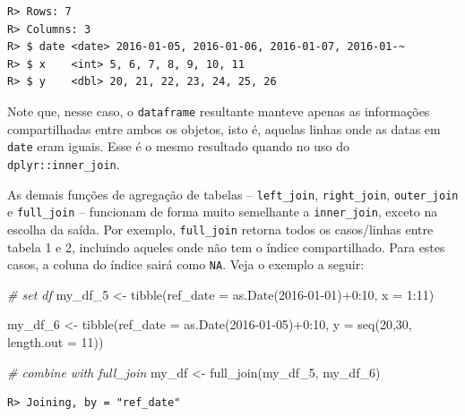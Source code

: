 \documentclass[
  11pt,
]{book}
\newenvironment{Shaded}{\begin{snugshade}}{\end{snugshade}}
\newcommand{\AttributeTok}[1]{\textcolor[rgb]{0.61,0.61,0.61}{#1}}
\newcommand{\CommentTok}[1]{\textcolor[rgb]{0.37,0.37,0.37}{\textit{#1}}}
\newcommand{\DecValTok}[1]{\textcolor[rgb]{0.06,0.06,0.06}{#1}}
\newcommand{\FunctionTok}[1]{\textcolor[rgb]{0,0,0}{#1}}
\newcommand{\NormalTok}[1]{#1}
\newcommand{\OtherTok}[1]{\textcolor[rgb]{0.37,0.37,0.37}{#1}}
\newcommand{\SpecialCharTok}[1]{\textcolor[rgb]{0,0,0}{#1}}
\newcommand{\StringTok}[1]{\textcolor[rgb]{0.5,0.5,0.5}{#1}}
\begin{document}
\begin{verbatim}
R> Rows: 7
R> Columns: 3
R> $ date <date> 2016-01-05, 2016-01-06, 2016-01-07, 2016-01-~
R> $ x    <int> 5, 6, 7, 8, 9, 10, 11
R> $ y    <dbl> 20, 21, 22, 23, 24, 25, 26
\end{verbatim}

Note que, nesse caso, o \texttt{dataframe} resultante manteve apenas as informações compartilhadas entre ambos os objetos, isto é, aquelas linhas onde as datas em \texttt{date} eram iguais. Esse é o mesmo resultado quando no uso do \texttt{dplyr::inner\_join}.

As demais funções de agregação de tabelas -- \texttt{left\_join}, \texttt{right\_join}, \texttt{outer\_join} e \texttt{full\_join} -- funcionam de forma muito semelhante a \texttt{inner\_join}, exceto na escolha da saída. Por exemplo, \texttt{full\_join} retorna todos os casos/linhas entre tabela 1 e 2, incluindo aqueles onde não tem o índice compartilhado. Para estes casos, a coluna do índice sairá como \texttt{NA}. Veja o exemplo a seguir:

\begin{Shaded}
\begin{Highlighting}[]
\CommentTok{\# set df}
\NormalTok{my\_df\_5 }\OtherTok{\textless{}{-}} \FunctionTok{tibble}\NormalTok{(}\AttributeTok{ref\_date =} \FunctionTok{as.Date}\NormalTok{(}\StringTok{\textquotesingle{}2016{-}01{-}01\textquotesingle{}}\NormalTok{)}\SpecialCharTok{+}\DecValTok{0}\SpecialCharTok{:}\DecValTok{10}\NormalTok{,}
                  \AttributeTok{x =} \DecValTok{1}\SpecialCharTok{:}\DecValTok{11}\NormalTok{)}

\NormalTok{my\_df\_6 }\OtherTok{\textless{}{-}} \FunctionTok{tibble}\NormalTok{(}\AttributeTok{ref\_date =} \FunctionTok{as.Date}\NormalTok{(}\StringTok{\textquotesingle{}2016{-}01{-}05\textquotesingle{}}\NormalTok{)}\SpecialCharTok{+}\DecValTok{0}\SpecialCharTok{:}\DecValTok{10}\NormalTok{,}
                  \AttributeTok{y =} \FunctionTok{seq}\NormalTok{(}\DecValTok{20}\NormalTok{,}\DecValTok{30}\NormalTok{, }\AttributeTok{length.out =} \DecValTok{11}\NormalTok{))}

\CommentTok{\# combine with full\_join}
\NormalTok{my\_df }\OtherTok{\textless{}{-}} \FunctionTok{full\_join}\NormalTok{(my\_df\_5, my\_df\_6)}
\end{Highlighting}
\end{Shaded}

\begin{verbatim}
R> Joining, by = "ref_date"
\end{verbatim}
\end{document}
